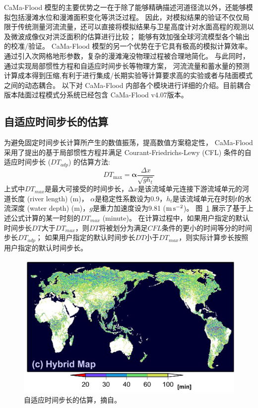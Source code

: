CaMa-Flood 模型的主要优势之一在于除了能够精确描述河道径流以外，还能够模拟包括漫滩水位和漫滩面积变化等洪泛过程。
因此，对模拟结果的验证不仅仅局限于传统测量河流流量，还可以直接将模拟结果与卫星高度计对水面高程的观测以及微波成像仪对洪泛面积的估算进行比较；
能够有效加强全球河流模型各个输出的校准/验证\citep{yamazaki2012adjustment,yamazaki2012analysis}。
CaMa-Flood 模型的另一个优势在于它具有极高的模拟计算效率。通过引入次网格地形参数，复杂的漫滩淹没物理过程被合理地简化。
与此同时，通过实现局部惯性方程和自适应时间步长等物理方案\citep{bates2010}，
河流流量和蓄水量的预测计算成本得到压缩,有利于进行集成/长期实验等计算要求高的实验或者与陆面模式之间的动态耦合。
以下对 CaMa-Flood 内部各个模块进行详细的介绍。目前耦合版本陆面过程模式分系统已经包含 CaMa-Flood v4.07版本。


\subsection{自适应时间步长的估算}
为避免固定时间步长计算所产生的数值振荡，提高数值方案稳定性，
CaMa-Flood 采用了\citet{bates2010}提出的基于局部惯性方程并满足 Courant-Friedrichs-Lewy (CFL) 
条件的自适应时间步长 ($DT_{adp}$) 的估算方法:
\begin{equation}
{DT}_{\max }=\boldsymbol{\alpha} \frac{\Delta x}{\sqrt{g h_{t}}}
\end{equation}
上式中$DT_{max}$是最大可接受的时间步长，$∆x$是该流域单元连接下游流域单元的河道长度 (river length) (m)，
$\alpha$是稳定性系数设为0.9，$h_t$是该流域单元在时刻$t$的水流深度 (water depth) (m)，$g$是重力加速度设为9.81 ($\rm m\,s^{-2}$)。
图~\ref{fig:自适应时间步长的估算} 展示了基于上述公式计算的某一时刻的$DT_{max}$ (minute)。
在计算过程中，如果用户指定的默认时间步长$DT$大于$DT_{max}$，则$DT$将被划分为满足$CFL$条件的更小的时间等分的时间步长$DT_{adp}$；
如果用户指定的默认时间步长$DT$小于$DT_{max}$，则实际计算步长按照用户指定的默认时间步长。
{
\begin{figure}[]
\centering
\includegraphics{Figures/陆地表面的水分循环/自适应时间步长的估算.png}
\caption{自适应时间步长的估算，摘自\citet{yamazaki2013improving}。}
\label{fig:自适应时间步长的估算}
\end{figure}
}


